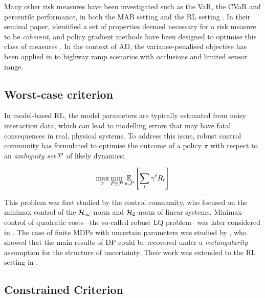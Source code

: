 Many other risk measures have been investigated such as the \ac{VaR}, the \ac{CVaR} and percentile performance, in both the \acl*{MAB} setting \citet{Torossian19a} and the \acl*{RL} setting \citep{Moody2001,Tamar2012,Prashanth2013,Delage2010}. In their seminal paper, \citet{Artzner1999} identified a set of properties deemed necessary for a risk measure to be \emph{coherent}, and policy gradient methods have been designed to optimise this class of measures \citep{Tamar2015}.
In the context of \acl*{AD}, the variance-penalised objective has been applied in \eg \citep{Naghshvar2018} to highway ramp scenarios with occlusions and limited sensor range.

\subsection{Worst-case criterion}

In model-based \acl*{RL}, the model parameters are typically estimated from noisy interaction data, which can lead to modelling errors that may have fatal consequences in real, physical systems. To address this issue, robust control community has formulated to optimise the outcome of a policy $\pi$ with respect to an \emph{ambiguity set} $\mathcal{P}$ of likely dynamics:

\begin{equation*}
\max_\pi \min_{P\in\mathcal{P}} \operatorname*{\mathbb{E}}_{\pi, P} \left[\sum_t \gamma^t R_t\right]
\end{equation*}

This problem was first studied by the control community, who focused on the minimax control of the $\mathcal{H}_\infty$-norm \citep[][]{Basar1996} and $\mathcal{H}_2$-norm \citep{Berkenkamp2015} of linear systems. Minimax-control of quadratic costs --the so-called robust \ac{LQ} problem-- was later considered in \citep{abbasi-yadkori11a,Ibrahimi2013,Faradonbeh2017,Ouyang2017,abeille18a,Dean2017,Dean2018}.
The case of finite \acp*{MDP} with uncertain parameters was studied by \citet{Iyengar2005,Nilim2005,Wiesemann2013}, who showed that the main results of \ac{DP} could be recovered under a \emph{rectangularity} assumption for the structure of uncertainty. Their work was extended to the \ac*{RL} setting in \citep{Tamar2014}.


\subsection{Constrained Criterion}
\label{sec:constrained-criterion}

